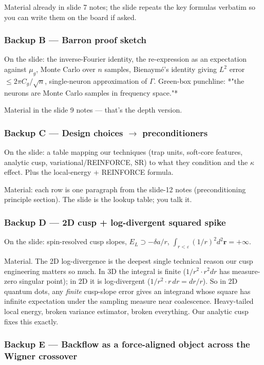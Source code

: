 \documentclass[11pt]{article}
\begin{document}
Material already in slide 7 notes; the slide repeats the key formulas
verbatim so you can write them on the board if asked.

\subsubsection*{Backup B --- Barron proof sketch}

On the slide: the inverse-Fourier identity, the re-expression as an
expectation against $\mu_g$, Monte Carlo over $n$ samples, Bienaym\'e's
identity giving $L^2$ error $\le 2\pi C_g / \sqrt n$, single-neuron
approximation of $\Gamma$. Green-box punchline: *"the neurons are Monte
Carlo samples in frequency space."*

Material in the slide 9 notes --- that's the depth version.

\subsubsection*{Backup C --- Design choices $\to$ preconditioners}

On the slide: a table mapping our techniques (trap units, soft-core
features, analytic cusp, variational/REINFORCE, SR) to what they
condition and the $\kappa$ effect. Plus the local-energy + REINFORCE
formula.

Material: each row is one paragraph from the slide-12 notes (preconditioning
principle section). The slide is the lookup table; you talk it.

\subsubsection*{Backup D --- 2D cusp + log-divergent squared spike}

On the slide: spin-resolved cusp slopes, $E_L \supset -\delta a / r$,
$\int_{r < \varepsilon}(1/r)^2 d^2 \mathbf r = +\infty$.

Material. The 2D log-divergence is the deepest single technical reason
our cusp engineering matters so much. In 3D the integral is finite
($1/r^2 \cdot r^2 dr$ has measure-zero singular point); in 2D it is
log-divergent ($1/r^2 \cdot r \, dr = dr/r$). So in 2D quantum dots, any
\emph{finite} cusp-slope error gives an integrand whose square has infinite
expectation under the sampling measure near coalescence. Heavy-tailed
local energy, broken variance estimator, broken everything. Our analytic
cusp fixes this exactly.

\subsubsection*{Backup E --- Backflow as a force-aligned object across the Wigner crossover}
\end{document}
